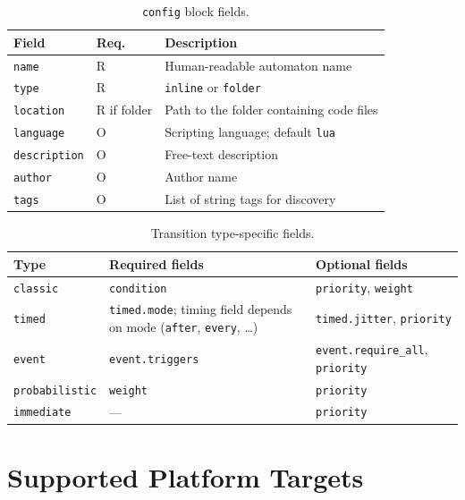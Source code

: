 \begin{table}[!htbp]
  \centering
  \caption{\texttt{config} block fields.}
  \label{tab:app-config}
  \vskip6pt
  \begin{tabularx}{\textwidth}{llX}
    \toprule
    Field & Req. & Description \\
    \midrule
    \texttt{name}        & R             & Human-readable automaton name \\
    \texttt{type}        & R             & \texttt{inline} or \texttt{folder} \\
    \texttt{location}    & R if folder   & Path to the folder containing code files \\
    \texttt{language}    & O             & Scripting language; default \texttt{lua} \\
    \texttt{description} & O             & Free-text description \\
    \texttt{author}      & O             & Author name \\
    \texttt{tags}        & O             & List of string tags for discovery \\
    \bottomrule
  \end{tabularx}
\end{table}

\begin{table}[!htbp]
  \centering
  \caption{Transition type-specific fields.}
  \label{tab:app-transitions}
  \vskip6pt
  \begin{tabularx}{\textwidth}{lXX}
    \toprule
    Type & Required fields & Optional fields \\
    \midrule
    \texttt{classic}       & \texttt{condition}      & \texttt{priority}, \texttt{weight} \\
    \texttt{timed}         & \texttt{timed.mode}; timing field depends on mode (\texttt{after}, \texttt{every}, \ldots) & \texttt{timed.jitter}, \texttt{priority} \\
    \texttt{event}         & \texttt{event.triggers} & \texttt{event.require\_all}, \texttt{priority} \\
    \texttt{probabilistic} & \texttt{weight}         & \texttt{priority} \\
    \texttt{immediate}     & ---                     & \texttt{priority} \\
    \bottomrule
  \end{tabularx}
\end{table}

\chapter{Supported Platform Targets}
\label{app:targets}

